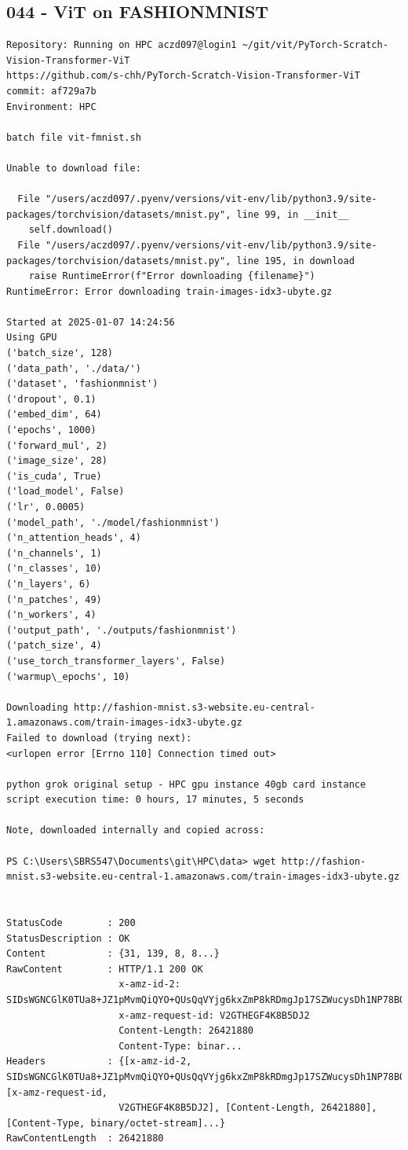 \subsection{044 - ViT on FASHIONMNIST}
\label{app_res:044}
\begin{verbatim}
Repository: Running on HPC aczd097@login1 ~/git/vit/PyTorch-Scratch-Vision-Transformer-ViT
https://github.com/s-chh/PyTorch-Scratch-Vision-Transformer-ViT
commit: af729a7b
Environment: HPC

batch file vit-fmnist.sh

Unable to download file:

  File "/users/aczd097/.pyenv/versions/vit-env/lib/python3.9/site-packages/torchvision/datasets/mnist.py", line 99, in __init__
    self.download()
  File "/users/aczd097/.pyenv/versions/vit-env/lib/python3.9/site-packages/torchvision/datasets/mnist.py", line 195, in download
    raise RuntimeError(f"Error downloading {filename}")
RuntimeError: Error downloading train-images-idx3-ubyte.gz

Started at 2025-01-07 14:24:56
Using GPU
('batch_size', 128)
('data_path', './data/')
('dataset', 'fashionmnist')
('dropout', 0.1)
('embed_dim', 64)
('epochs', 1000)
('forward_mul', 2)
('image_size', 28)
('is_cuda', True)
('load_model', False)
('lr', 0.0005)
('model_path', './model/fashionmnist')
('n_attention_heads', 4)
('n_channels', 1)
('n_classes', 10)
('n_layers', 6)
('n_patches', 49)
('n_workers', 4)
('output_path', './outputs/fashionmnist')
('patch_size', 4)
('use_torch_transformer_layers', False)
('warmup\_epochs', 10)

Downloading http://fashion-mnist.s3-website.eu-central-1.amazonaws.com/train-images-idx3-ubyte.gz
Failed to download (trying next):
<urlopen error [Errno 110] Connection timed out>

python grok original setup - HPC gpu instance 40gb card instance script execution time: 0 hours, 17 minutes, 5 seconds

Note, downloaded internally and copied across:

PS C:\Users\SBRS547\Documents\git\HPC\data> wget http://fashion-mnist.s3-website.eu-central-1.amazonaws.com/train-images-idx3-ubyte.gz


StatusCode        : 200
StatusDescription : OK
Content           : {31, 139, 8, 8...}
RawContent        : HTTP/1.1 200 OK
                    x-amz-id-2: SIDsWGNCGlK0TUa8+JZ1pMvmQiQYO+QUsQqVYjg6kxZmP8kRDmgJp17SZWucysDh1NP78BO+Ats0g/H/qDG+gw==
                    x-amz-request-id: V2GTHEGF4K8B5DJ2
                    Content-Length: 26421880
                    Content-Type: binar...
Headers           : {[x-amz-id-2, SIDsWGNCGlK0TUa8+JZ1pMvmQiQYO+QUsQqVYjg6kxZmP8kRDmgJp17SZWucysDh1NP78BO+Ats0g/H/qDG+gw==], [x-amz-request-id, 
                    V2GTHEGF4K8B5DJ2], [Content-Length, 26421880], [Content-Type, binary/octet-stream]...}
RawContentLength  : 26421880

\end{verbatim}


